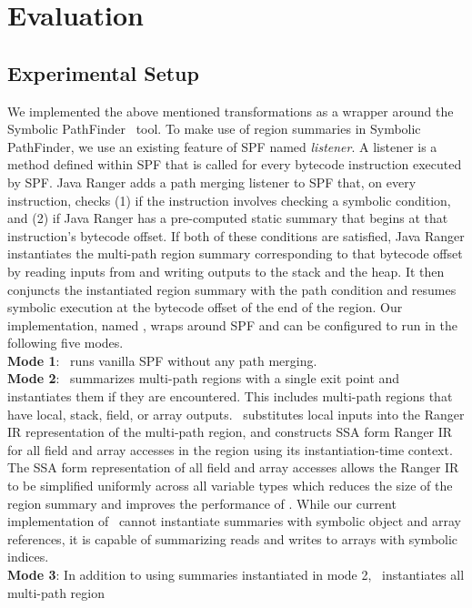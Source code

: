 \section{Evaluation}
\label{sec:results}
\subsection{Experimental Setup}
%
We implemented the above mentioned transformations as a wrapper around the Symbolic PathFinder~\cite{spf} tool.
%
To make use of region summaries in Symbolic PathFinder, we use an existing feature of SPF named \textit{listener}.
%
A listener is a method defined within SPF that is called for every bytecode instruction executed by SPF.
%
Java Ranger adds a path merging listener to SPF that, on every instruction, checks (1) if the instruction involves
checking a symbolic condition, and (2) if Java Ranger has a pre-computed static summary that begins at that
instruction\rq s bytecode offset.
%
If both of these conditions are satisfied, Java Ranger instantiates the multi-path region summary corresponding to that
bytecode offset by reading inputs from and writing outputs to the stack and the heap.
%
It then conjuncts the instantiated region summary with the path condition and resumes symbolic execution at the
bytecode offset of the end of the region.
%
Our implementation, named \tool, wraps around SPF and can be configured to run in the following five modes.\\
%
\textbf{Mode 1}: \tool\ runs vanilla SPF without any path merging.\\
%
\textbf{Mode 2}: \tool\ summarizes multi-path regions with a single exit point and instantiates them if they are encountered.
This includes multi-path regions that have local, stack, field, or array outputs.
%
\tool\ substitutes local inputs into the Ranger IR representation of the multi-path region, and constructs SSA form
Ranger IR for all field and array accesses in the region using its instantiation-time context.
%
The SSA form representation of all field and array accesses allows the Ranger IR to be simplified uniformly across all
variable types which reduces the size of the region summary and improves the performance of \tool.
%
While our current implementation of \tool\ cannot instantiate summaries with symbolic object and array
references, it is capable of summarizing reads and writes to arrays with symbolic indices.\\
%
\textbf{Mode 3}: In addition to using summaries instantiated in mode 2, \tool\ instantiates all multi-path region
